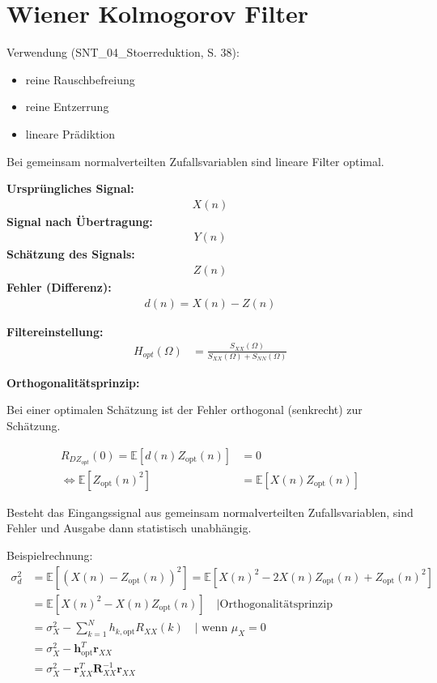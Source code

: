 \section{Wiener Kolmogorov Filter}

Verwendung (SNT\_04\_Stoerreduktion, S. 38):
\begin{itemize}
\item reine Rauschbefreiung
\item reine Entzerrung
\item lineare Prädiktion
\end{itemize}

Bei gemeinsam normalverteilten Zufallsvariablen sind lineare Filter optimal.


\textbf{Ursprüngliches Signal:}
\begin{align}
X(n)
\end{align}
\textbf{Signal nach Übertragung:}
\begin{align}
Y(n)
\end{align}
\textbf{Schätzung des Signals:}
\begin{align}
Z(n)
\end{align}
\textbf{Fehler (Differenz):}
\begin{align}
d(n) = X(n) - Z(n)
\end{align}

\textbf{Filtereinstellung:}
\begin{align}
H_{opt}(\Omega) &= \frac{S_{XX}(\Omega)}{S_{XX}(\Omega) + S_{NN}(\Omega)}
\end{align}


\textbf{Orthogonalitätsprinzip:}

Bei einer optimalen Schätzung ist der Fehler orthogonal (senkrecht) zur Schätzung.

\begin{align}
R_{DZ_{opt}}(0) = \mathbb{E}[d(n)Z_{\text{opt}}(n)] &= 0 \\
\Leftrightarrow \mathbb{E}[Z_{\text{opt}}(n)^2] &= \mathbb{E}[X(n) Z_{\text{opt}}(n)]
\end{align}

Besteht das Eingangssignal aus gemeinsam normalverteilten Zufallsvariablen, sind Fehler und Ausgabe dann statistisch unabhängig.

Beispielrechnung:
\begin{align}
\sigma_d^2 &= \mathbb{E}[(X(n)-Z_{\text{opt}}(n))^2]= \mathbb{E}[X(n)^2 - 2X(n)Z_{\text{opt}}(n) + Z_{\text{opt}}(n)^2] \\
&= \mathbb{E}[X(n)^2-X(n)Z_{\text{opt}}(n)] \quad \text{|Orthogonalitätsprinzip} \\
&= \sigma_X^2 - \sum_{k=1}^{N} h_{k,\text{opt}}R_{XX}(k)\quad \text{| wenn }\mu_X = 0 \\
&= \sigma_X^2 - \mathbf{h}_{\text{opt}}^T\mathbf{r}_{XX}\\
&= \sigma_X^2 - \mathbf{r}_{XX}^T\mathbf{R}_{XX}^{-1}\mathbf{r}_{XX}
\end{align}


